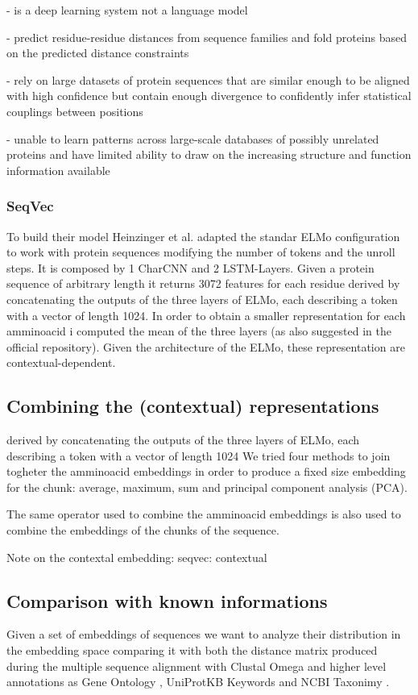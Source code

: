 \documentclass[12pt, letterpaper, twocolumn]{article}
\begin{document}
- is a deep learning system not a language model

- predict residue-residue distances from sequence families and fold proteins based on the predicted distance constraints

- rely on large datasets of protein sequences that are similar enough to be aligned with high confidence but contain enough divergence to confidently infer statistical couplings between positions

- unable to learn patterns across large-scale databases of possibly unrelated proteins and have limited ability to draw on the increasing structure and function information available


\subsubsection{SeqVec}
To build their model Heinzinger et al.\cite{heinzinger2019modeling} adapted the standar ELMo configuration \cite{peters-etal-2018-deep} to work with protein sequences modifying the number of tokens and the unroll steps. It is composed by 1 CharCNN and 2 LSTM-Layers. Given a protein sequence of arbitrary length it returns 3072 features for each residue derived by concatenating the outputs of the three layers of ELMo, each describing a token with a vector of length 1024. In order to obtain a smaller representation for each amminoacid i computed the mean of the three layers (as also suggested in the official repository). Given the architecture of the ELMo, these representation are contextual-dependent.

\subsection{Combining the (contextual) representations}derived by concatenating the outputs of the three layers of ELMo, each describing a token with a vector of length 1024
We tried four methods to join togheter the amminoacid embeddings in order to produce a fixed size embedding for the chunk: average, maximum, sum and principal component analysis (PCA). 

The same operator used to combine the amminoacid embeddings is also used to combine the embeddings of the chunks of the sequence.

Note on the contextal embedding: seqvec: contextual

\subsection{Comparison with known informations}
Given a set of embeddings of sequences we want to analyze their distribution in the embedding space comparing it with both the distance matrix produced during the multiple sequence alignment with Clustal Omega \cite{sievers2011fast} and higher level annotations as Gene Ontology \cite{10.1093/genetics/iyad031, ashburner2000gene}, UniProtKB Keywords and NCBI Taxonimy \cite{uniprot23}.
\end{document}
